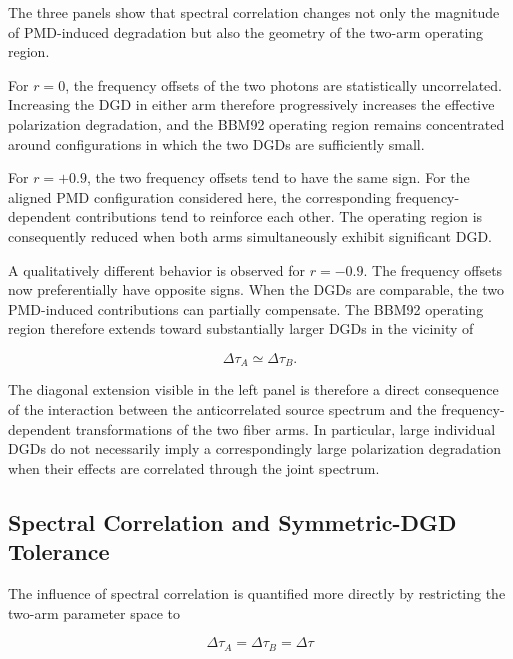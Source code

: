 The three panels show that spectral correlation changes not only the magnitude
of PMD-induced degradation but also the geometry of the two-arm operating
region.

For \(r=0\), the frequency offsets of the two photons are statistically
uncorrelated. Increasing the DGD in either arm therefore progressively increases
the effective polarization degradation, and the BBM92 operating region remains
concentrated around configurations in which the two DGDs are sufficiently
small.

For \(r=+0.9\), the two frequency offsets tend to have the same sign. For the
aligned PMD configuration considered here, the corresponding
frequency-dependent contributions tend to reinforce each other. The operating
region is consequently reduced when both arms simultaneously exhibit
significant DGD.

A qualitatively different behavior is observed for \(r=-0.9\). The frequency
offsets now preferentially have opposite signs. When the DGDs are comparable,
the two PMD-induced contributions can partially compensate. The BBM92 operating
region therefore extends toward substantially larger DGDs in the vicinity of

\begin{equation}
\Delta\tau_A
\simeq
\Delta\tau_B.
\end{equation}

The diagonal extension visible in the left panel is therefore a direct
consequence of the interaction between the anticorrelated source spectrum and
the frequency-dependent transformations of the two fiber arms. In particular,
large individual DGDs do not necessarily imply a correspondingly large
polarization degradation when their effects are correlated through the joint
spectrum.



\subsection{Spectral Correlation and Symmetric-DGD Tolerance}

The influence of spectral correlation is quantified more directly by restricting
the two-arm parameter space to

\begin{equation}
\Delta\tau_A
=
\Delta\tau_B
=
\Delta\tau
\end{equation}

